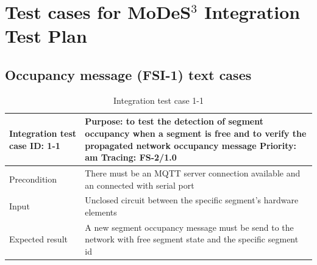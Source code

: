 \section{Test cases for MoDeS$^3$ Integration Test Plan} \label{appendix:IntTC}
\subsection{Occupancy message (FSI-1) text cases} 
\begin{table}[H]
	\caption{Integration test case 1-1}
	\label{table:TCase-FSI1-1}
	\begin{center}
		\renewcommand{\arraystretch}{1.8}
		\begin{tabu} 
			to 0.9 \textwidth
			{  X[0.3, l] X[l] }
			\toprule
			Integration test case ID: 1-1 & Purpose: to test the detection of segment occupancy when a segment is free and to verify the propagated network occupancy message \newline Priority: am \newline Tracing: FS-2/1.0 \\ \midrule
			Precondition                  & There must be an MQTT server connection available and an connected with serial port                                                                                                \\
			Input                         & Unclosed circuit between the specific segment's hardware elements                                                                                                                  \\
			Expected result               & A new segment occupancy message must be send to the network with free segment state  and the specific segment id                                                                   \\ \bottomrule
		\end{tabu}
	\end{center}
\end{table} 

